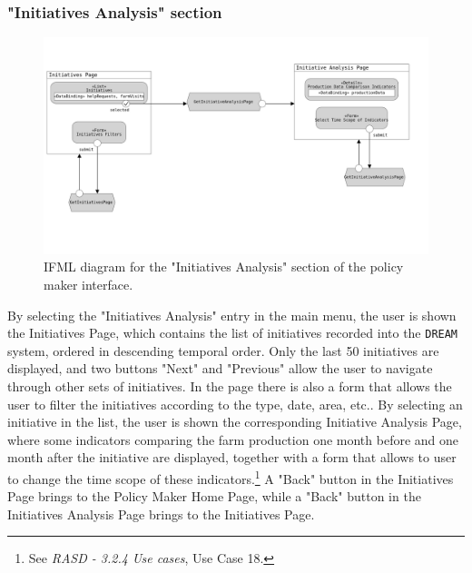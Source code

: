 \documentclass{article}
\begin{document}
\subsubsection{"Initiatives Analysis" section}
\begin{figure}[H]
    \centering
     \includegraphics[scale=0.17]{diagrams/ui diagrams/policymaker/initiatives analysis.png} 
    \caption{IFML diagram for the "Initiatives Analysis" section of the policy maker interface.}
\end{figure}
By selecting the "Initiatives Analysis" entry in the main menu, the user is shown the Initiatives Page, which contains the list of initiatives recorded into the \verb|DREAM| system, ordered in descending temporal order. Only the last 50 initiatives are displayed, and two buttons "Next" and "Previous" allow the user to navigate through other sets of initiatives. In the page there is also a form that allows the user to filter the initiatives according to the type, date, area, etc.. \newline
By selecting an initiative in the list, the user is shown the corresponding Initiative Analysis Page, where some indicators comparing the farm production one month before and one month after the initiative are displayed, together with a form that allows to user to change the time scope of these indicators.\footnote{See \textit{RASD - 3.2.4 Use cases}, Use Case 18.} \newline
A "Back" button in the Initiatives Page brings to the Policy Maker Home Page, while a "Back" button in the Initiatives Analysis Page brings to the Initiatives Page.

\newpage
\end{document}
